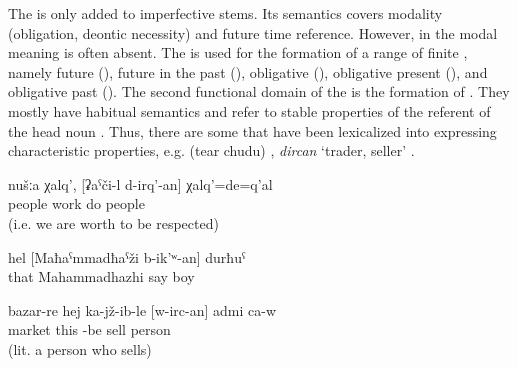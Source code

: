 The   is only added to imperfective stems. Its semantics covers modality (obligation, deontic necessity) and future time reference. However, in  the modal meaning is often absent. The  is used for the formation of a range of finite , namely future (), future in the past (), obligative (), obligative present (), and obligative past (). The second functional domain of the  is the formation of . They mostly have habitual semantics and refer to stable properties of the referent of the head noun . Thus, there are some  that have been lexicalized into  expressing characteristic properties, e.g.  (tear  chudu) , \textit{dircan} `trader, seller' .
	\begin{exe}
		\ex	\label{ex:We are people who were working}
		\gll	nušːa	χalq',	[ʡaˁči-l	d-irq'-an]	χalq'=de=q'al\\
				people	work	do	people\\
		\glt	{} (i.e. we are worth to be respected)

		\ex	\label{ex:the boy called MahammadhazhiVerbs}
		\gll	hel	[Maħaˁmmadħaˁži	b-ik'ʷ-an]	durħuˁ\\
			that	Mahammadhazhi	say	boy	\\
		\glt	{}

		\ex	\label{ex:on the market seated is a trader (a person who sells)}
		\gll	bazar-re	hej	ka-jž-ib-le	[w-irc-an]	admi	ca-w\\
			market	this	-be	sell	person	\\
		\glt	{} (lit. a person who sells)
	\end{exe}

